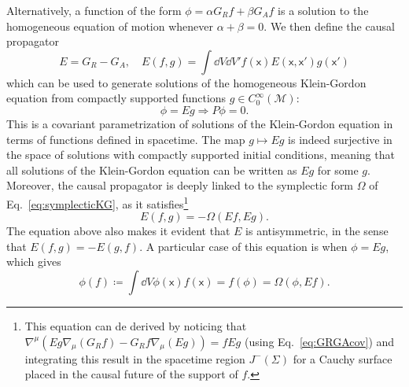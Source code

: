 \documentclass[letterpaper,12pt,titlepage,oneside,final]{book}
\newcommand{\M}{\mathcal{M}}
\newcommand{\mf}{\mathsf}%
\begin{document}
Alternatively, a function of the form $\phi = \alpha G_Rf + \beta G_Af$ is a solution to the homogeneous equation of motion whenever $\alpha + \beta = 0$. We then define the causal propagator
\begin{equation}
    E = G_R - G_A, \quad E(f,g) = \int \dd V \dd V' f(\mf x) E(\mf x, \mf x')g(\mf x')
\end{equation}
which can be used to generate solutions of the homogeneous Klein-Gordon equation from compactly supported functions $g\in C_0^\infty(\M)$:
\begin{equation} 
    \phi = Eg \Rightarrow P\phi = 0.
\end{equation}
This is a covariant parametrization of solutions of the Klein-Gordon equation in terms of functions defined in spacetime. The map $g\mapsto Eg$ is indeed surjective in the space of solutions with compactly supported initial conditions, meaning that all solutions of the Klein-Gordon equation can be written as $Eg$ for some $g$. Moreover, the causal propagator is deeply linked to the symplectic form $\Omega$ of Eq.~\eqref{eq:symplecticKG}, as it satisfies\footnote{This equation can de derived by noticing that $\nabla^\mu(Eg \nabla_\mu(G_Rf)-G_Rf\nabla_\mu (Eg)) = f Eg$ (using Eq.~\eqref{eq:GRGAcov}) and integrating this result in the spacetime region $J^-(\Sigma)$ for a Cauchy surface placed in the causal future of the support of $f$.}
\begin{equation}\label{eq:EOmega}
    E(f,g) = - \Omega(Ef,Eg).
\end{equation}
The equation above also makes it evident that $E$ is antisymmetric, in the sense that $E(f,g) = - E(g,f)$. A particular case of this equation is when $\phi = Eg$, which gives
\begin{equation}\label{eq:phisymplecticEclass}
    \phi(f)\coloneqq \int \dd V \phi(\mf x) f(\mf x) = f(\phi) =  \Omega(\phi,Ef).
\end{equation}
\end{document}
